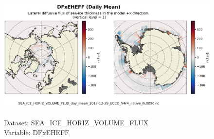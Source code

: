 \begin{figure}[H]
\centering
\includegraphics[scale=0.5]{../images/plots/native_plots/Sea-Ice_and_Snow_Horizontal_Volume_Fluxes/DFxEHEFF.png}
\caption{\\Dataset: SEA\_ICE\_HORIZ\_VOLUME\_FLUX\\Variable: DFxEHEFF}
\label{tab:table-SEA_ICE_HORIZ_VOLUME_FLUX_DFxEHEFF-Plot}
\end{figure}
\pagebreak
